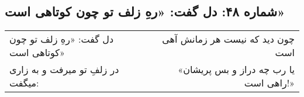 \begin{center}
\section*{شماره ۴۸: دل گفت: «رهِ زلف تو چون کوتاهی است»}
\label{sec:048}
\begin{longtable}{l p{0.5cm} r}
دل گفت: «رهِ زلف تو چون کوتاهی است»
&&
چون دید که نیست هر زمانش آهی است
\\
در زلفِ تو میرفت و به زاری میگفت:
&&
«یا رب چه دراز و بس پریشان راهی است!»
\\
\end{longtable}
\end{center}
